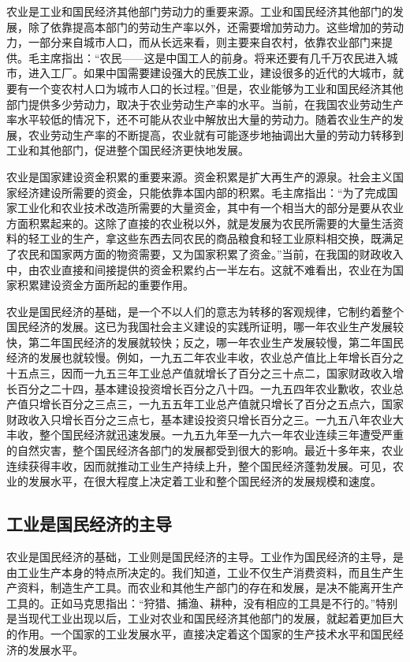 \documentclass{book}
\begin{document}
农业是工业和国民经济其他部门劳动力的重要来源。工业和国民经济其他部门的发展，除了依靠提高本部门的劳动生产率以外，还需要增加劳动力。这些增加的劳动力，一部分来自城市人口，而从长远来看，则主要来自农村，依靠农业部门来提供。毛主席指出：“农民——这是中国工人的前身。将来还要有几千万农民进入城市，进入工厂。如果中国需要建设强大的民族工业，建设很多的近代的大城市，就要有一个变农村人口为城市人口的长过程。”但是，农业能够为工业和国民经济其他部门提供多少劳动力，取决于农业劳动生产率的水平。当前，在我国农业劳动生产率水平较低的情况下，还不可能从农业中解放出大量的劳动力。随着农业生产的发展，农业劳动生产率的不断提高，农业就有可能逐步地抽调出大量的劳动力转移到工业和其他部门，促进整个国民经济更快地发展。

农业是国家建设资金积累的重要来源。资金积累是扩大再生产的源泉。社会主义国家经济建设所需要的资金，只能依靠本国内部的积累。毛主席指出：“为了完成国家工业化和农业技术改造所需要的大量资金，其中有一个相当大的部分是要从农业方面积累起来的。这除了直接的农业税以外，就是发展为农民所需要的大量生活资料的轻工业的生产，拿这些东西去同农民的商品粮食和轻工业原料相交换，既满足了农民和国家两方面的物资需要，又为国家积累了资金。”当前，在我国的财政收入中，由农业直接和间接提供的资金积累约占一半左右。这就不难看出，农业在为国家积累建设资金方面所起的重要作用。

农业是国民经济的基础，是一个不以人们的意志为转移的客观规律，它制约着整个国民经济的发展。这已为我国社会主义建设的实践所证明，哪一年农业生产发展较快，第二年国民经济的发展就较快；反之，哪一年农业生产发展较慢，第二年国民经济的发展也就较慢。例如，一九五二年农业丰收，农业总产值比上年增长百分之十五点三，因而一九五三年工业总产值就增长了百分之三十点二，国家财政收入增长百分之二十四，基本建设投资增长百分之八十四。一九五四年农业歉收，农业总产值只增长百分之三点三，一九五五年工业总产值就只增长了百分之五点六，国家财政收入只增长百分之三点七，基本建设投资只增长百分之三。一九五八年农业大丰收，整个国民经济就迅速发展。一九五九年至一九六一年农业连续三年遭受严重的自然灾害，整个国民经济各部门的发展都受到很大的影响。最近十多年来，农业连续获得丰收，因而就推动工业生产持续上升，整个国民经济蓬勃发展。可见，农业的发展水平，在很大程度上决定着工业和整个国民经济的发展规模和速度。

\subsection{工业是国民经济的主导}

农业是国民经济的基础，工业则是国民经济的主导。工业作为国民经济的主导，是由工业生产本身的特点所决定的。我们知道，工业不仅生产消费资料，而且生产生产资料，制造生产工具。而农业和其他生产部门的存在和发展，是决不能离开生产工具的。正如马克思指出：“狩猎、捕渔、耕种，没有相应的工具是不行的。”特别是当现代工业出现以后，工业对农业和国民经济其他部门的发展，就起着更加巨大的作用。一个国家的工业发展水平，直接决定着这个国家的生产技术水平和国民经济的发展水平。
\end{document}
